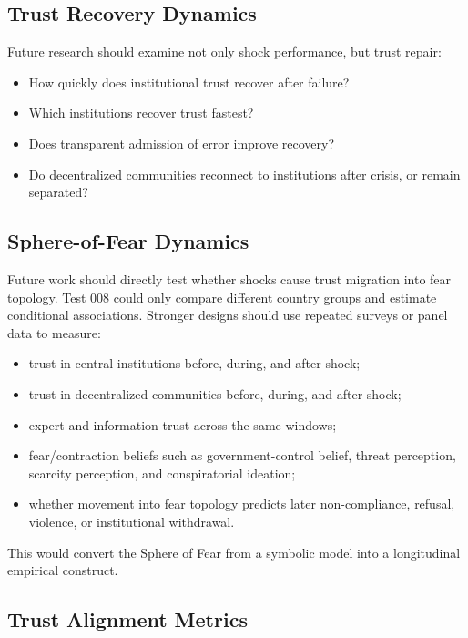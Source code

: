 \documentclass[12pt]{article}
\begin{document}
\subsection{Trust Recovery Dynamics}

Future research should examine not only shock performance, but trust repair:

\begin{itemize}
  \item How quickly does institutional trust recover after failure?
  \item Which institutions recover trust fastest?
  \item Does transparent admission of error improve recovery?
  \item Do decentralized communities reconnect to institutions after crisis, or remain separated?
\end{itemize}

\subsection{Sphere-of-Fear Dynamics}

Future work should directly test whether shocks cause trust migration into fear topology. Test 008 could only compare different country groups and estimate conditional associations. Stronger designs should use repeated surveys or panel data to measure:

\begin{itemize}
  \item trust in central institutions before, during, and after shock;
  \item trust in decentralized communities before, during, and after shock;
  \item expert and information trust across the same windows;
  \item fear/contraction beliefs such as government-control belief, threat perception, scarcity perception, and conspiratorial ideation;
  \item whether movement into fear topology predicts later non-compliance, refusal, violence, or institutional withdrawal.
\end{itemize}

This would convert the Sphere of Fear from a symbolic model into a longitudinal empirical construct.

\subsection{Trust Alignment Metrics}
\end{document}
